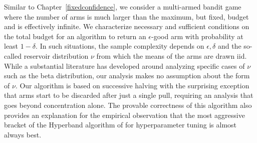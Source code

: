 Similar to Chapter~\ref{fixedconfidence}, we consider a multi-armed bandit game where the number of arms is much larger than the maximum, but fixed, budget and is effectively infinite.
We characterize necessary and sufficient conditions on the total budget for an algorithm to return an $\epsilon$-good arm with probability at least $1-\delta$.
In such situations, the sample complexity depends on $\epsilon, \delta$ and the so-called reservoir distribution $\nu$ from which the means of the arms are drawn iid. 
While a substantial literature has developed around analyzing specific cases of $\nu$ such as the beta distribution, our analysis makes no assumption about the form of $\nu$.
Our algorithm is based on successive halving with the surprising exception that arms start to be discarded after just a single pull, requiring an analysis that goes beyond concentration alone. 
The provable correctness of this algorithm also provides an explanation for the empirical observation that the most aggressive bracket of the Hyperband algorithm of \cite{li2017hyperband} for hyperparameter tuning is almost always best.    





\clearpage

\clearpage

%

